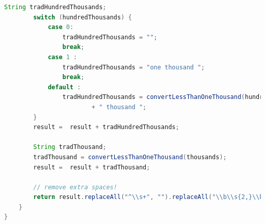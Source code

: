 \begin{lstlisting}[language=Java, caption=EnglishNumberToWords]
		String tradHundredThousands;
		switch (hundredThousands) {
			case 0:
				tradHundredThousands = "";
				break;
			case 1 :
				tradHundredThousands = "one thousand ";
				break;
			default :
				tradHundredThousands = convertLessThanOneThousand(hundredThousands)
						+ " thousand ";
		}
		result =  result + tradHundredThousands;

		String tradThousand;
		tradThousand = convertLessThanOneThousand(thousands);
		result =  result + tradThousand;

		// remove extra spaces!
		return result.replaceAll("^\\s+", "").replaceAll("\\b\\s{2,}\\b", " ");
	}
}
\end{lstlisting}
